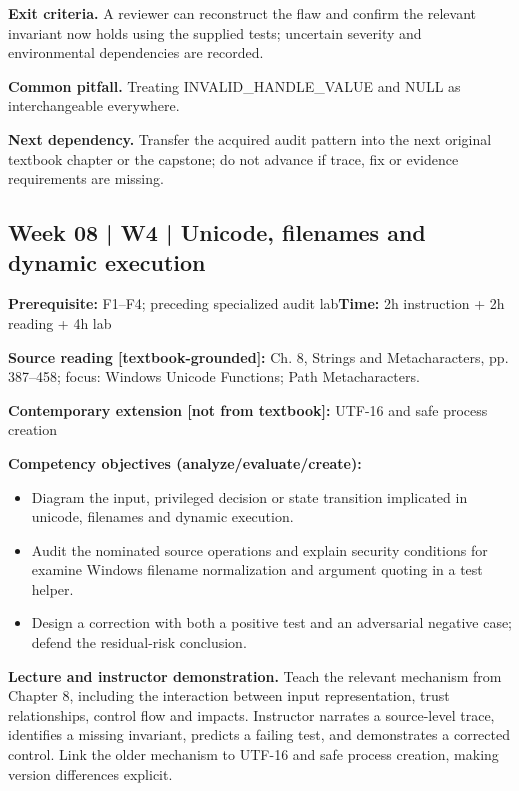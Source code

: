 \documentclass[10pt,letterpaper]{article}
\begin{document}
\textbf{Exit criteria.} A reviewer can reconstruct the flaw and confirm the relevant invariant now holds using the supplied tests; uncertain severity and environmental dependencies are recorded.

\textbf{Common pitfall.} Treating INVALID\_HANDLE\_VALUE and NULL as interchangeable everywhere.

\textbf{Next dependency.} Transfer the acquired audit pattern into the next original textbook chapter or the capstone; do not advance if trace, fix or evidence requirements are missing.

\subsection{Week 08 | W4 | Unicode, filenames and dynamic execution}
\textbf{Prerequisite:} F1--F4; preceding specialized audit lab\hfill\textbf{Time:} 2h instruction + 2h reading + 4h lab

\textbf{Source reading [textbook-grounded]:} Ch. 8, Strings and Metacharacters, pp. 387--458; focus: Windows Unicode Functions; Path Metacharacters.

\textbf{Contemporary extension [not from textbook]:} UTF-16 and safe process creation

\textbf{Competency objectives (analyze/evaluate/create):}
\begin{itemize}[leftmargin=*,itemsep=2pt]
\item Diagram the input, privileged decision or state transition implicated in unicode, filenames and dynamic execution.
\item Audit the nominated source operations and explain security conditions for examine Windows filename normalization and argument quoting in a test helper.
\item Design a correction with both a positive test and an adversarial negative case; defend the residual-risk conclusion.
\end{itemize}
\textbf{Lecture and instructor demonstration.} Teach the relevant mechanism from Chapter 8, including the interaction between input representation, trust relationships, control flow and impacts. Instructor narrates a source-level trace, identifies a missing invariant, predicts a failing test, and demonstrates a corrected control. Link the older mechanism to UTF-16 and safe process creation, making version differences explicit.
\end{document}
